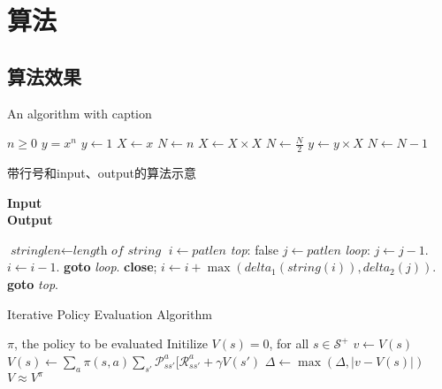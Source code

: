 \documentclass[math,logic,quote,code,mode=simple]{codedumpnote}
\begin{document}
\chapter{算法}

\section{算法效果}

\begin{algorithm}
\caption{An algorithm with caption}\label{alg:cap}
\begin{algorithmic}
\Require $n \geq 0$
\Ensure $y = x^n$
\State $y \gets 1$
\State $X \gets x$
\State $N \gets n$
    \State $X \gets X \times X$
    \State $N \gets \frac{N}{2}$  
    \State $y \gets y \times X$
    \State $N \gets N - 1$
\EndIf
\EndWhile
\end{algorithmic}
\end{algorithm}

\begin{algorithm}
\caption{带行号和input、output的算法示意}\label{alg:cap}
\hspace*{\algorithmicindent} \textbf{Input} \\
\hspace*{\algorithmicindent} \textbf{Output} 
\begin{algorithmic}[1]
    \State $\textit{stringlen} \gets \textit{length of } \textit{string}$
    \State $i \gets \textit{patlen}$
    \State \emph{top}:
     \Return false
    \EndIf
    \State $j \gets \textit{patlen}$
    \State \emph{loop}:
    \State $j \gets j-1$.
    \State $i \gets i-1$.
    \State \textbf{goto} \emph{loop}.
    \State \textbf{close};
    \EndIf
    \State $i \gets i+\max(\textit{delta}_1(\textit{string}(i)),\textit{delta}_2(j))$.
    \State \textbf{goto} \emph{top}.
    \EndProcedure\end{algorithmic}
\end{algorithm}

\begin{algorithm} 
\caption{Iterative Policy Evaluation Algorithm}
\begin{algorithmic}[1]
\Require $\pi$, the policy to be evaluated
\State Initilize $V(s) = 0$, for all $s \in \mathcal S^+$
\Repeat
{}
\State $v \gets V(s)$
\State $V(s) \gets \sum_a \pi(s,a) \sum_{s'} \mathcal P_{ss'}^a [ \mathcal R_{ss'}^a + \gamma V(s')$
\State $\Delta \gets \max(\Delta, |v- V(s)|)$
\EndFor
{}
\Ensure $V \approx V^\pi$
\end{algorithmic}
\end{algorithm}
\end{document}

